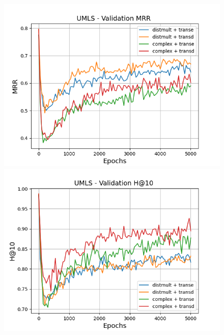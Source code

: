 \begin{figure}[H]
    \centering
    \begin{minipage}{.5\textwidth}
      \centering
      \includegraphics[width=\linewidth]{figures/results/gan_train/pretrained/random/umls/gan_train_random_umls_mrrs.png}
    \end{minipage}%
    \begin{minipage}{.5\textwidth}
      \centering
      \includegraphics[width=\linewidth]{figures/results/gan_train/pretrained/random/umls/gan_train_random_umls_hit10s.png}
    \end{minipage}
    

\end{figure}
